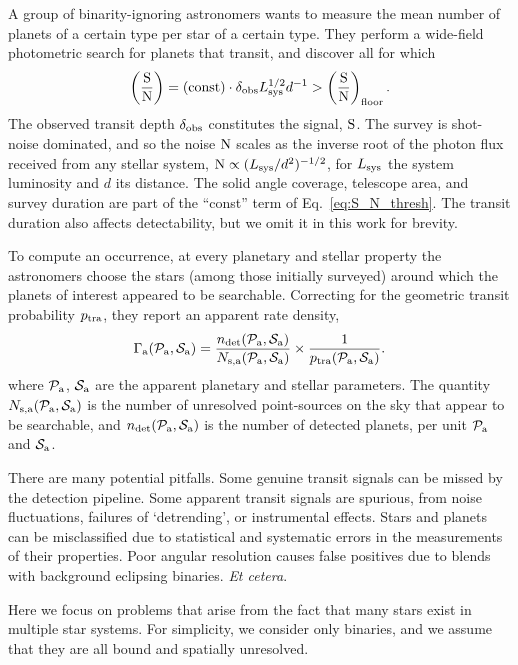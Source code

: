 \documentclass[12pt,modern]{aastex61}
\newcommand{\pp}{\mathcal{P}}
\newcommand{\ps}{\mathcal{S}}
\renewcommand{\a}{_{\rm a}}
\begin{document}
A group of binarity-ignoring astronomers wants to measure the mean number of 
planets of a certain type per star of a certain type.
They perform a wide-field photometric search for planets that transit, and 
discover all for which
\begin{equation}
\left(\frac{{\rm S}}{{\rm N}}\right)
= ({\rm const}) \cdot \delta_{\rm obs} L_{\rm sys}^{1/2} d^{-1}
> \left(\frac{{\rm S}}{{\rm N}}\right)_{\rm floor}.
\label{eq:S_N_thresh}
\end{equation}
The observed transit depth $\delta_{\rm obs}$ constitutes the signal, ${\rm 
S}$. The survey is shot-noise dominated, and so the noise ${\rm N}$
scales as the inverse root of the photon flux received from any stellar 
system, ${\rm N} \propto (L_{\rm sys}/d^2)^{-1/2}$, for $L_{\rm sys}$ the 
system luminosity and $d$ its distance.
The solid angle coverage, telescope area, and survey duration are part of the 
``const'' term of Eq.~\ref{eq:S_N_thresh}. The transit duration also 
affects detectability, but we omit it in this work for brevity.

To compute an occurrence, at every planetary and stellar property the 
astronomers choose the stars (among those initially surveyed) around which the 
planets of interest appeared to be searchable.
Correcting for the geometric transit probability $p_{\rm tra}$, they report an 
apparent rate density,
\begin{equation}
\Gamma\a(\pp\a, \ps\a) = \frac{n_{\rm det}(\pp\a, \ps\a)}{N_{\rm s,a}(\pp\a, 
    \ps\a)} \times \frac{1}{p_{\rm tra}(\pp\a, \ps\a)}.
\label{eq:defn_apparent_rate_density}
\end{equation}
where $\pp\a$, $\ps\a$ are the apparent planetary and stellar parameters.
The quantity $N_{\rm s,a}(\pp\a, \ps\a)$ is the number of unresolved 
point-sources on the sky that appear to be searchable, and
$n_{\rm det}(\pp\a, \ps\a)$ is the number of detected planets, per unit 
$\pp\a$ and $\ps\a$. 


There are many potential pitfalls.  Some genuine transit signals can be missed
by the detection pipeline.  Some apparent transit signals are spurious, from
noise fluctuations, failures of `detrending', or instrumental effects.  Stars
and planets can be misclassified due to statistical and systematic errors in
the measurements of their properties.  Poor angular resolution causes false
positives due to blends with background eclipsing binaries. {\it Et cetera}.

Here we focus on problems that arise from the fact that many stars exist in 
multiple star systems.
For simplicity, we consider only binaries, and we assume that they are all 
bound and spatially unresolved.
\end{document}
